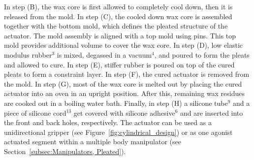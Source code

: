 In step (B), the wax core is first allowed to completely cool down, then it is released from the mold.
In step (C), the cooled down wax core is assembled together with the bottom mold, which defines the pleated structure of the actuator.
The mold assembly is aligned with a top mold using pins. This top mold provides additional volume to cover the wax core.
In step (D), low elastic modulus rubber$^3$ is mixed, degassed in a vacuum$^4$, and poured to form the pleats and allowed to cure.
In step (E), stiffer rubber is poured on top of the cured pleats to form a constraint layer.
In step (F), the cured actuator is removed from the mold.
In step (G), most of the wax core is melted out by placing the cured actuator into an oven in an upright position.
After this, remaining wax residues are cooked out in a boiling water bath.
Finally, in step (H) a silicone tube$^9$ and a piece of silicone cord$^13$ get covered with silicone adhesive$^6$ and are inserted into the front and back holes, respectively.
The actuator can be used as a unidirectional gripper (see Figure~\ref{fig:cylindrical_design}) or as one agonist actuated segment within a multiple body manipulator (see Section~\ref{subsec:Manipulators, Pleated}).

